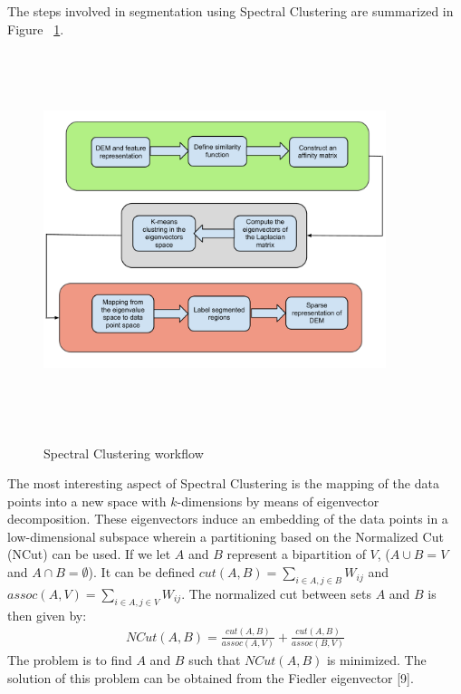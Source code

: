 \documentclass[12pt,letterpaper]{article}
\begin{document}
The steps involved in segmentation using Spectral Clustering are summarized in Figure ~\ref{fig:fig2}.
\begin{figure}[ht!]
\center
      \includegraphics[width=10cm,height=11cm,keepaspectratio]{figs/fig3_pdf.pdf}\\
  \caption{Spectral Clustering workflow}\label{fig:fig2}
\end{figure}
The most interesting aspect of Spectral Clustering is the mapping of the data points into a new space with
$k$-dimensions by means of eigenvector decomposition. 
These eigenvectors induce an embedding of the data points in a low-dimensional subspace wherein a
partitioning based on the Normalized Cut (NCut) can be used. If we let $A$ and $B$ represent a bipartition
of $V$, ($ A \cup B = V$ and $A\cap B = \emptyset$). It can be defined $cut (A, B) =  \sum_{i\in A,j\in B}W_{ij}$ and 
$assoc(A, V) = \sum_{i \in A, j \in V}W_{ij}$. The normalized cut between sets $A$ and $B$ is then given by:
\begin{align}
NCut(A, B) = \frac{cut(A, B)}{assoc(A, V)} + \frac{cut(A, B)}{assoc(B, V)}
\end{align}
The problem is to find $A$ and $B$ such that $NCut(A, B)$ is minimized. The solution of this problem can be 
obtained from the Fiedler eigenvector [9].
 
\end{document}

